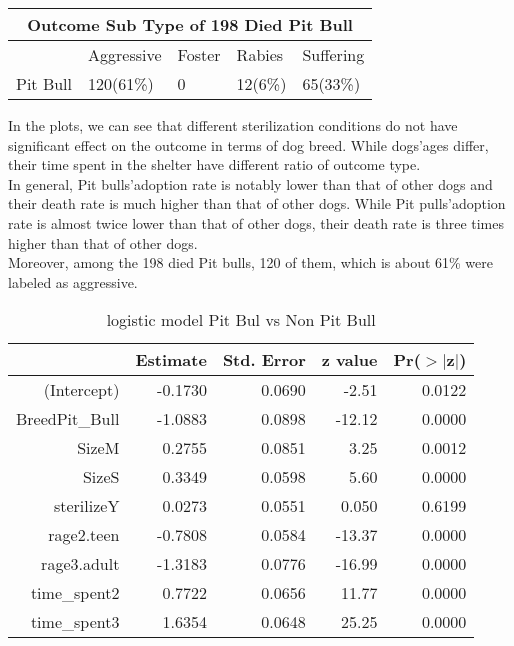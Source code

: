 \documentclass[12pt]{article}
\begin{document}
\begin{flushleft}
\begin{table}[H]
\begin{tabular}{|l | l  l l l|}
\multicolumn {5}{|c|}{Outcome Sub Type of 198 Died Pit Bull} \\\hline
            & Aggressive & Foster & Rabies & Suffering  \\  
Pit Bull    & 120(61\%) & 0 & 12(6\%) & 65(33\%)    \\ \hline
\end{tabular}
\end{table}
In the plots, we can see that different sterilization conditions do not have significant effect on the outcome in terms of dog breed. While dogs\rq\space ages differ, their time spent in the shelter have different ratio of outcome type.\\
In general, Pit bulls\rq\space adoption rate is notably lower than that of other dogs and their death rate is much higher than that of other dogs. While Pit pulls\rq adoption rate is almost twice lower than that of other dogs, their death rate is three times higher than that of other dogs.\\
Moreover, among the 198 died Pit bulls, 120 of them, which is about 61\% were labeled as aggressive.\\

\begin{center}
\begin{table}[H]
\centering
\caption{logistic model Pit Bul vs Non Pit Bull}
\begin{tabular}{rrrrr}
  \hline
 & Estimate & Std. Error & z value & Pr($>$$|$z$|$) \\ 
  \hline
(Intercept) & -0.1730 & 0.0690 & -2.51 & 0.0122 \\ 
  BreedPit\_Bull & -1.0883 & 0.0898 & -12.12 & 0.0000 \\ 
  SizeM & 0.2755 & 0.0851 & 3.25 & 0.0012 \\ 
  SizeS & 0.3349 & 0.0598 & 5.60 & 0.0000 \\ 
  sterilizeY & 0.0273 & 0.0551 & 0.050 & 0.6199 \\ 
  rage2.teen & -0.7808 & 0.0584 & -13.37 & 0.0000 \\ 
  rage3.adult & -1.3183 & 0.0776 & -16.99 & 0.0000 \\ 
  time\_spent2 & 0.7722 & 0.0656 & 11.77 & 0.0000 \\ 
  time\_spent3 & 1.6354 & 0.0648 & 25.25 & 0.0000 \\ 
   \hline
\end{tabular}
\end{table}
\end{center}


\end{flushleft}
\end{document}
